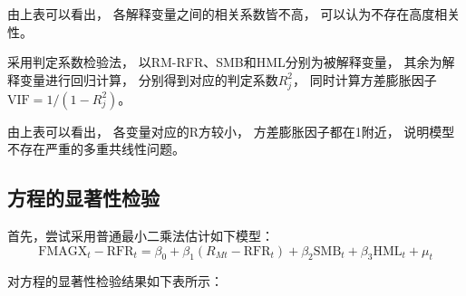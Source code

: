 \documentclass[UTF8]{ctexart}
\begin{document}
由上表可以看出，
各解释变量之间的相关系数皆不高，
可以认为不存在高度相关性。


采用判定系数检验法，
以RM-RFR、SMB和HML分别为被解释变量，
其余为解释变量进行回归计算，
分别得到对应的判定系数$R_j^2$，
同时计算方差膨胀因子$\mathrm{VIF}=1/(1-R_j^2)$。




由上表可以看出，
各变量对应的R方较小，
方差膨胀因子都在1附近，
说明模型不存在严重的多重共线性问题。



\subsection{方程的显著性检验}

首先，尝试采用普通最小二乘法估计如下模型：
\begin{equation}
  \text{FMAGX}_t-\mathrm{RFR}_t=\beta_0+\beta_1\left( R_{Mt}-\mathrm{RFR}_t \right)+ \beta_2\mathrm{SMB}_t+\beta_3\mathrm{HML}_t + \mu_t
\end{equation}


对方程的显著性检验结果如下表所示：

\end{document}
